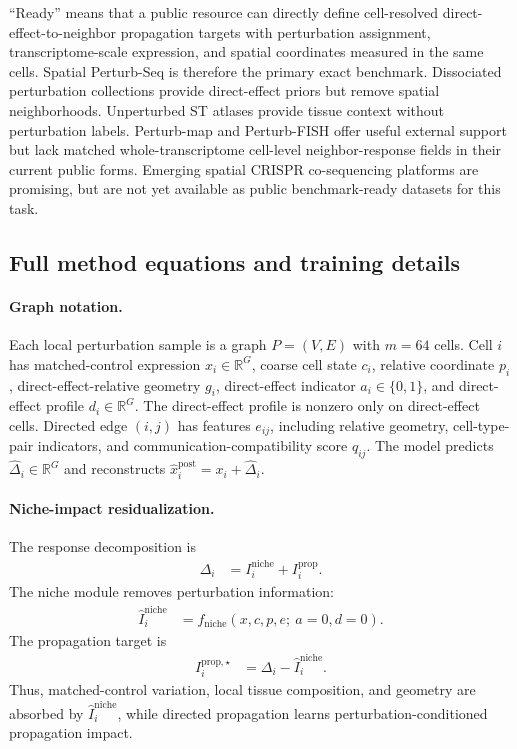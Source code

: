 \documentclass[sigconf,review,balance=false]{acmart}
\begin{document}
``Ready'' means that a public resource can directly define cell-resolved direct-effect-to-neighbor propagation targets with perturbation assignment, transcriptome-scale expression, and spatial coordinates measured in the same cells. Spatial Perturb-Seq is therefore the primary exact benchmark. Dissociated perturbation collections provide direct-effect priors but remove spatial neighborhoods. Unperturbed ST atlases provide tissue context without perturbation labels. Perturb-map and Perturb-FISH offer useful external support but lack matched whole-transcriptome cell-level neighbor-response fields in their current public forms. Emerging spatial CRISPR co-sequencing platforms are promising, but are not yet available as public benchmark-ready datasets for this task.

\subsection{Full method equations and training details}
\label{app:method_full_details}

\paragraph{Graph notation.}
Each local perturbation sample is a graph $P=(V,E)$ with $m=64$ cells. Cell $i$ has matched-control expression $x_i\in\mathbb R^G$, coarse cell state $c_i$, relative coordinate $p_i$, direct-effect-relative geometry $g_i$, direct-effect indicator $a_i\in\{0,1\}$, and direct-effect profile $d_i\in\mathbb R^G$. The direct-effect profile is nonzero only on direct-effect cells. Directed edge $(i,j)$ has features $e_{ij}$, including relative geometry, cell-type-pair indicators, and communication-compatibility score $q_{ij}$. The model predicts $\widehat\Delta_i\in\mathbb R^G$ and reconstructs $\widehat x_i^{\mathrm{post}}=x_i+\widehat\Delta_i$.

\paragraph{Niche-impact residualization.}
The response decomposition is
\[
\begin{aligned}
\Delta_i
&=
I_i^{\mathrm{niche}}+I_i^{\mathrm{prop}} .
\end{aligned}
\]
The niche module removes perturbation information:
\[
\begin{aligned}
\widehat I_i^{\mathrm{niche}}
&=
f_{\mathrm{niche}}(x,c,p,e;\ a=0,d=0).
\end{aligned}
\]
The propagation target is
\[
\begin{aligned}
I_i^{\mathrm{prop},\star}
&=
\Delta_i-\widehat I_i^{\mathrm{niche}} .
\end{aligned}
\]
Thus, matched-control variation, local tissue composition, and geometry are absorbed by $\widehat I_i^{\mathrm{niche}}$, while directed propagation learns perturbation-conditioned propagation impact.
\end{document}
